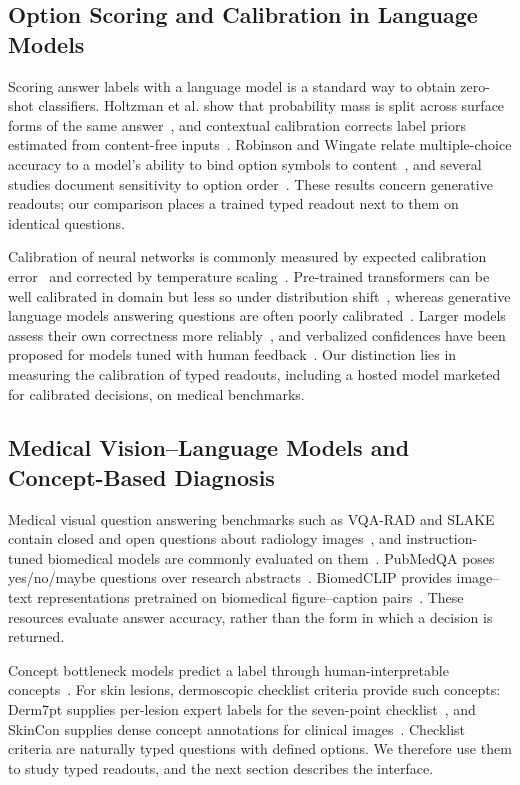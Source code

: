 \documentclass{article}
\begin{document}
\subsection{Option Scoring and Calibration in Language Models}
Scoring answer labels with a language model is a standard way to obtain zero-shot classifiers. Holtzman et al. show that probability mass is split across surface forms of the same answer~\citep{holtzman2021surface}, and contextual calibration corrects label priors estimated from content-free inputs~\citep{zhao2021calibrate}. Robinson and Wingate relate multiple-choice accuracy to a model's ability to bind option symbols to content~\citep{robinson2023mcq}, and several studies document sensitivity to option order~\citep{pezeshkpour2023order,zheng2024mcq}. These results concern generative readouts; our comparison places a trained typed readout next to them on identical questions.

Calibration of neural networks is commonly measured by expected calibration error~\citep{naeini2015ece} and corrected by temperature scaling~\citep{guo2017calibration}. Pre-trained transformers can be well calibrated in domain but less so under distribution shift~\citep{desai2020calibration}, whereas generative language models answering questions are often poorly calibrated~\citep{jiang2021calibration}. Larger models assess their own correctness more reliably~\citep{kadavath2022know}, and verbalized confidences have been proposed for models tuned with human feedback~\citep{tian2023justask}. Our distinction lies in measuring the calibration of typed readouts, including a hosted model marketed for calibrated decisions, on medical benchmarks.

\subsection{Medical Vision--Language Models and Concept-Based Diagnosis}
Medical visual question answering benchmarks such as VQA-RAD and SLAKE contain closed and open questions about radiology images~\citep{lau2018vqarad,liu2021slake}, and instruction-tuned biomedical models are commonly evaluated on them~\citep{li2023llavamed}. PubMedQA poses yes/no/maybe questions over research abstracts~\citep{jin2019pubmedqa}. BiomedCLIP provides image--text representations pretrained on biomedical figure--caption pairs~\citep{zhang2023biomedclip}. These resources evaluate answer accuracy, rather than the form in which a decision is returned.

Concept bottleneck models predict a label through human-interpretable concepts~\citep{koh2020cbm}. For skin lesions, dermoscopic checklist criteria provide such concepts: Derm7pt supplies per-lesion expert labels for the seven-point checklist~\citep{kawahara2019derm7pt}, and SkinCon supplies dense concept annotations for clinical images~\citep{daneshjou2022skincon}. Checklist criteria are naturally typed questions with defined options. We therefore use them to study typed readouts, and the next section describes the interface.
\end{document}
